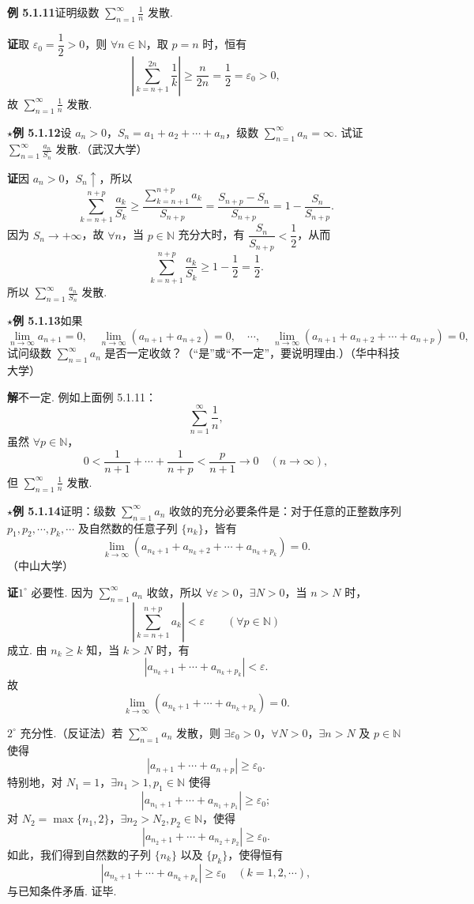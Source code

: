 \documentclass[UTF8, 12pt, fontset=fandol, oneside]{ctexart}
\begin{document}
\noindent\textbf{例 5.1.11}\quad 证明级数 $\displaystyle\sum_{n=1}^\infty\frac1n$ 发散.

\noindent\textbf{证}\quad 取 $\varepsilon_0=\dfrac12>0$，则 $\forall n\in\mathbb{N}$，取 $p=n$ 时，恒有
\[
  \left|\sum_{k=n+1}^{2n}\frac1k\right|
  \ge \frac n{2n}=\frac12=\varepsilon_0>0,
\]
故 $\displaystyle\sum_{n=1}^\infty\frac1n$ 发散.

\noindent\textbf{$\star$例 5.1.12}\quad 设 $a_n>0$，$S_n=a_1+a_2+\cdots+a_n$，级数 $\displaystyle\sum_{n=1}^\infty a_n=\infty$. 试证 $\displaystyle\sum_{n=1}^\infty\frac{a_n}{S_n}$ 发散.（武汉大学）

\noindent\textbf{证}\quad 因 $a_n>0$，$S_n\uparrow$，所以
\[
  \sum_{k=n+1}^{n+p}\frac{a_k}{S_k}
  \ge \frac{\sum_{k=n+1}^{n+p}a_k}{S_{n+p}}
  =\frac{S_{n+p}-S_n}{S_{n+p}}
  =1-\frac{S_n}{S_{n+p}}.
\]
因为 $S_n\to+\infty$，故 $\forall n$，当 $p\in\mathbb{N}$ 充分大时，有 $\dfrac{S_n}{S_{n+p}}<\dfrac12$，从而
\[
  \sum_{k=n+1}^{n+p}\frac{a_k}{S_k}\ge 1-\frac12=\frac12.
\]
所以 $\displaystyle\sum_{n=1}^\infty\frac{a_n}{S_n}$ 发散.

\noindent\textbf{$\star$例 5.1.13}\quad 如果
\[
  \lim_{n\to\infty}a_{n+1}=0,\quad
  \lim_{n\to\infty}(a_{n+1}+a_{n+2})=0,\quad\cdots,\quad
  \lim_{n\to\infty}(a_{n+1}+a_{n+2}+\cdots+a_{n+p})=0,
\]
试问级数 $\displaystyle\sum_{n=1}^\infty a_n$ 是否一定收敛？（“是”或“不一定”，要说明理由.）（华中科技大学）

\noindent\textbf{解}\quad 不一定. 例如上面例 5.1.11：
\[
  \sum_{n=1}^\infty\frac1n,
\]
虽然 $\forall p\in\mathbb{N}$，
\[
  0<\frac1{n+1}+\cdots+\frac1{n+p}<\frac p{n+1}\to0\quad(n\to\infty),
\]
但 $\displaystyle\sum_{n=1}^\infty\frac1n$ 发散.

\noindent\textbf{$\star$例 5.1.14}\quad 证明：级数 $\displaystyle\sum_{n=1}^\infty a_n$ 收敛的充分必要条件是：对于任意的正整数序列 $p_1,p_2,\cdots,p_k,\cdots$ 及自然数的任意子列 $\{n_k\}$，皆有
\[
  \lim_{k\to\infty}(a_{n_k+1}+a_{n_k+2}+\cdots+a_{n_k+p_k})=0.
\]
（中山大学）

\noindent\textbf{证}\quad $1^\circ$ 必要性. 因为 $\displaystyle\sum_{n=1}^\infty a_n$ 收敛，所以 $\forall\varepsilon>0$，$\exists N>0$，当 $n>N$ 时，
\[
  \left|\sum_{k=n+1}^{n+p}a_k\right|<\varepsilon\qquad(\forall p\in\mathbb{N})
\]
成立. 由 $n_k\ge k$ 知，当 $k>N$ 时，有
\[
  |a_{n_k+1}+\cdots+a_{n_k+p_k}|<\varepsilon.
\]
故
\[
  \lim_{k\to\infty}(a_{n_k+1}+\cdots+a_{n_k+p_k})=0.
\]

$2^\circ$ 充分性.（反证法）若 $\displaystyle\sum_{n=1}^\infty a_n$ 发散，则 $\exists\varepsilon_0>0$，$\forall N>0$，$\exists n>N$ 及 $p\in\mathbb{N}$ 使得
\[
  |a_{n+1}+\cdots+a_{n+p}|\ge\varepsilon_0.
\]
特别地，对 $N_1=1$，$\exists n_1>1,p_1\in\mathbb{N}$ 使得
\[
  |a_{n_1+1}+\cdots+a_{n_1+p_1}|\ge\varepsilon_0;
\]
对 $N_2=\max\{n_1,2\}$，$\exists n_2>N_2,p_2\in\mathbb{N}$，使得
\[
  |a_{n_2+1}+\cdots+a_{n_2+p_2}|\ge\varepsilon_0.
\]
如此，我们得到自然数的子列 $\{n_k\}$ 以及 $\{p_k\}$，使得恒有
\[
  |a_{n_k+1}+\cdots+a_{n_k+p_k}|\ge\varepsilon_0\quad(k=1,2,\cdots),
\]
与已知条件矛盾. 证毕.
\end{document}

